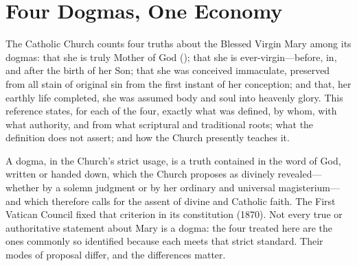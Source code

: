 \section{Four Dogmas, One Economy}

The Catholic Church counts four truths about the Blessed Virgin Mary among
its dogmas: that she is truly Mother of God (); that she is
ever-virgin---before, in, and after the birth of her Son; that she was
conceived immaculate, preserved from all stain of original sin from the
first instant of her conception; and that, her earthly life completed, she
was assumed body and soul into heavenly glory. This reference states, for
each of the four, exactly what was defined, by whom, with what authority,
and from what scriptural and traditional roots; what the definition does
not assert; and how the Church presently teaches it.

A dogma, in the Church's strict usage, is a truth contained in the word of
God, written or handed down, which the Church proposes as divinely
revealed---whether by a solemn judgment or by her ordinary and universal
magisterium---and which therefore calls for the assent of divine and
Catholic faith. The First Vatican Council fixed that criterion in its
constitution  (1870). Not every true or authoritative statement about
Mary is a dogma: the four treated here are the ones commonly so identified
because each meets that strict standard. Their modes of proposal differ,
and the differences matter.



